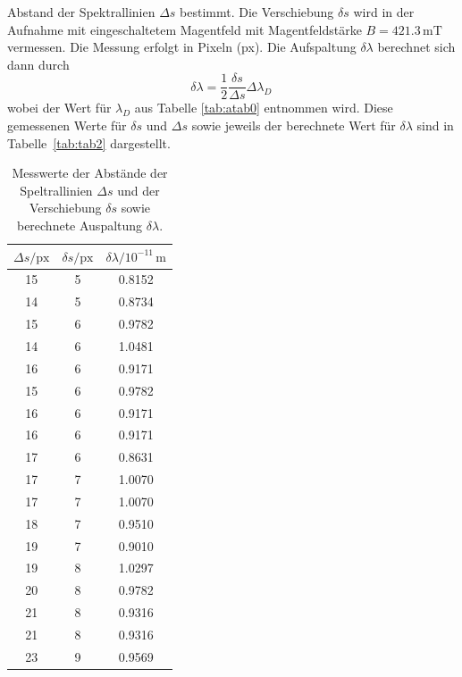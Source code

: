 Abstand der Spektrallinien $\Delta s$ bestimmt. Die Verschiebung $\delta s$ wird in der Aufnahme mit eingeschaltetem 
Magentfeld mit Magentfeldstärke $B = 421.3 \,\si{\milli\tesla}$ vermessen. Die Messung erfolgt in Pixeln (px).
Die Aufspaltung $\delta \lambda$ berechnet 
sich dann durch
\begin{equation}
    \label{eq:Auswertung}
    \delta \lambda = \frac{1}{2} \frac{\delta s}{\Delta s} \Delta \lambda_D \,
\end{equation}
wobei der Wert für $\lambda_D$ aus Tabelle \ref{tab:atab0} entnommen wird. 
Diese gemessenen Werte für $\delta s$ und $\Delta s$ sowie jeweils der berechnete Wert für $\delta \lambda$ sind in Tabelle \ref{tab:tab2} dargestellt.
\FloatBarrier
\begin{table}[h]
    \centering
    \caption{Messwerte der Abstände der Speltrallinien $\Delta s$ und der Verschiebung $\delta s$ sowie berechnete Auspaltung $\delta \lambda$.}
    \label{tab:atab2}
    \begin{tabular}{c c c}
        \toprule
        {$\Delta s / \text{px}$} & {$\delta s / \text{px}$} & {$\delta \lambda / 10^{-11}\, \si{\meter}$}\\
        \midrule
        15 & 5 & 0.8152 \\ 
        14 & 5 & 0.8734 \\
        15 & 6 & 0.9782 \\
        14 & 6 & 1.0481 \\
        16 & 6 & 0.9171 \\
        15 & 6 & 0.9782 \\
        16 & 6 & 0.9171 \\ 
        16 & 6 & 0.9171 \\
        17 & 6 & 0.8631 \\ 
        17 & 7 & 1.0070 \\ 
        17 & 7 & 1.0070 \\
        18 & 7 & 0.9510 \\
        19 & 7 & 0.9010 \\
        19 & 8 & 1.0297 \\
        20 & 8 & 0.9782 \\
        21 & 8 & 0.9316 \\
        21 & 8 & 0.9316 \\
        23 & 9 & 0.9569 \\
        \bottomrule
    \end{tabular}
\end{table}
\FloatBarrier
\noindent
